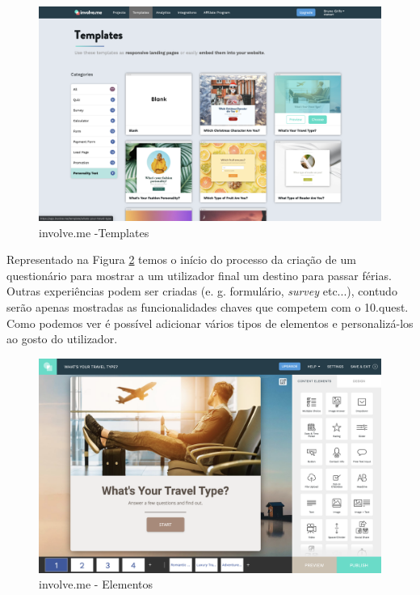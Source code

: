 \begin{figure}[ht!]
	\begin{center}
		\includegraphics[width=1\textwidth]{img/ivme/templates}
		\caption{involve.me -Templates}
		\label{fig:ivme-templares}
	\end{center}
\end{figure}


Representado na Figura \ref{fig:ivme-elements} temos o início do processo da criação de um questionário para mostrar a um utilizador final um destino para passar férias. Outras experiências podem ser criadas (e. g. formulário, \textit{survey} etc...), contudo serão apenas mostradas as funcionalidades chaves que competem com o 10.quest. Como podemos ver é possível adicionar vários tipos de elementos e personalizá-los ao gosto do utilizador. 


\begin{figure}[ht!]
	\begin{center}
		\includegraphics[width=1\textwidth]{img/ivme/elements}
		\caption{involve.me - Elementos}
		\label{fig:ivme-elements}
	\end{center}
\end{figure}

